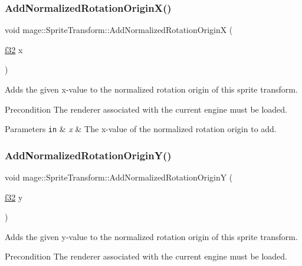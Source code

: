 \subsubsection{\texorpdfstring{Add\+Normalized\+Rotation\+Origin\+X()}{AddNormalizedRotationOriginX()}}
{\footnotesize\ttfamily void mage\+::\+Sprite\+Transform\+::\+Add\+Normalized\+Rotation\+OriginX (\begin{DoxyParamCaption}\item[{\hyperlink{namespacemage_a6a44ad388483959dc4dff9f2aef91431}{f32}}]{x }\end{DoxyParamCaption})}

Adds the given x-\/value to the normalized rotation origin of this sprite transform.

\begin{DoxyPrecond}{Precondition}
The renderer associated with the current engine must be loaded. 
\end{DoxyPrecond}

\begin{DoxyParams}[1]{Parameters}
\mbox{\tt in}  & {\em x} & The x-\/value of the normalized rotation origin to add. \\
\hline
\end{DoxyParams}
\hypertarget{structmage_1_1_sprite_transform_aee903f2612fd60682377948f4b3fc26d}{}\label{structmage_1_1_sprite_transform_aee903f2612fd60682377948f4b3fc26d} 
\subsubsection{\texorpdfstring{Add\+Normalized\+Rotation\+Origin\+Y()}{AddNormalizedRotationOriginY()}}
{\footnotesize\ttfamily void mage\+::\+Sprite\+Transform\+::\+Add\+Normalized\+Rotation\+OriginY (\begin{DoxyParamCaption}\item[{\hyperlink{namespacemage_a6a44ad388483959dc4dff9f2aef91431}{f32}}]{y }\end{DoxyParamCaption})}

Adds the given y-\/value to the normalized rotation origin of this sprite transform.

\begin{DoxyPrecond}{Precondition}
The renderer associated with the current engine must be loaded. 
\end{DoxyPrecond}

